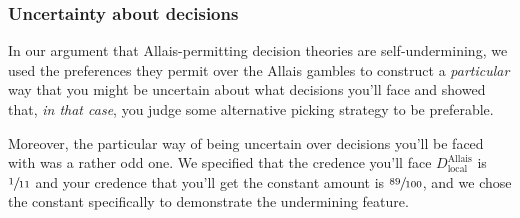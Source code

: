 \documentclass[a4paper]{article}
\newcommand{\todoold}[2][]{\todo[backgroundcolor=white,bordercolor=orange!10,linecolor=gray!10, #1,caption={},textcolor=gray]{Pre-rev: #2}}
\newcommand{\todooldinfo}[2][]{\todoold[#1]{#2}}
\renewcommand{\color}[1]{}
\newenvironment{CCM rewritten}
{\begingroup\color{blue}} %
{\endgroup}              %
\begin{document}
%
%


\subsubsection{Uncertainty about decisions}\label{sect:reu:other mu}

In our argument that Allais-permitting decision theories are self-undermining, we used the preferences they permit over the Allais gambles to construct a \emph{particular} way that you might be uncertain about what decisions you'll face and showed that, \emph{in that case}, you judge some alternative picking strategy to be preferable. 



Moreover, the particular way of being uncertain over decisions you'll be faced with was a rather odd one. We specified that the credence you'll face $D^{\mathrm{Allais}}_{\mathrm{local}}$ is $\sfrac{1}{11}$ and your credence that you'll get the constant amount is $\sfrac{89}{100}$, and we chose the constant specifically to demonstrate the undermining feature. 
	
\end{document}
